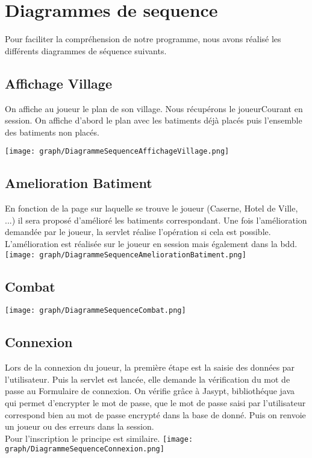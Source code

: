 \chapter{Diagrammes de sequence}
    Pour faciliter la compréhension de notre programme, nous avons réalisé les différents diagrammes de séquence suivants. 

    \section{Affichage Village}

    On affiche au joueur le plan de son village. Nous récupérons le joueurCourant en session. On affiche d'abord le plan avec les batiments déjà placés puis l'ensemble des batiments non placés. 
    
        \texttt{[image: graph/DiagrammeSequenceAffichageVillage.png]}
        
    
    \section{Amelioration Batiment}

    En fonction de la page sur laquelle se trouve le joueur (Caserne, Hotel de Ville, ...) il sera proposé d'amélioré les batiments correspondant. Une fois l'amélioration demandée par le joueur, la servlet réalise l'opération si cela est possible. L'amélioration est réalisée sur le joueur en session mais également dans la bdd.
        \texttt{[image: graph/DiagrammeSequenceAmeliorationBatiment.png]}
        
    
    \section{Combat}

        \texttt{[image: graph/DiagrammeSequenceCombat.png]}    
    
    \section{Connexion}

    Lors de la connexion du joueur, la première étape est la saisie des données par l'utilisateur. Puis la servlet est lancée, elle demande la vérification du mot de passe au Formulaire de connexion. On vérifie grâce à Jasypt, bibliothéque java qui permet d'encrypter le mot de passe, que le mot de passe saisi par l'utilisateur correspond bien au mot de passe encrypté dans la base de donné. Puis on renvoie un joueur ou des erreurs dans la session. \\
    Pour l'inscription le principe est similaire. 
        \texttt{[image: graph/DiagrammeSequenceConnexion.png]}  
        
